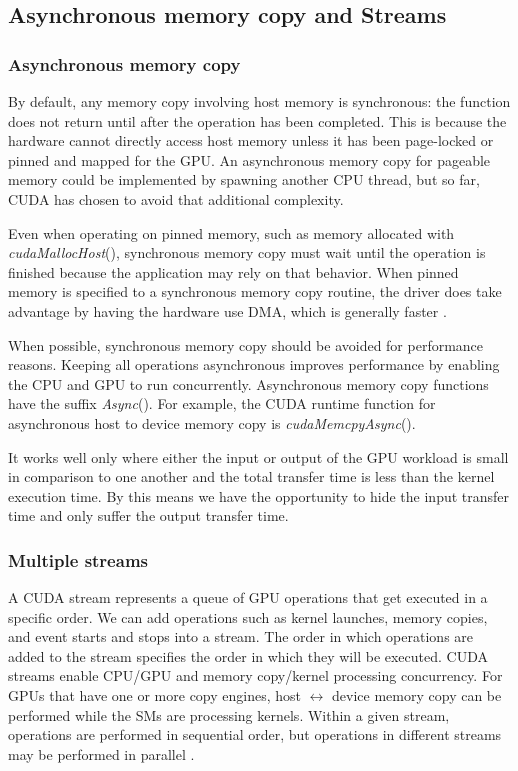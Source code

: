 \subsection{Asynchronous memory copy and Streams}
\label{asyn}

\subsubsection*{Asynchronous memory copy}
By default, any memory copy involving host memory is synchronous: the function does not return until after the operation has been completed. This is because the hardware cannot directly access host memory unless it has been page-locked or pinned and mapped for the GPU. An asynchronous memory copy for pageable memory could be implemented by spawning another CPU thread, but so far, CUDA has chosen to avoid that additional complexity.

Even when operating on pinned memory, such as memory allocated with \emph{cudaMallocHost}(), synchronous memory copy must wait until the operation is finished because the application may rely on that behavior. When pinned memory is specified to a synchronous memory copy routine, the driver does take advantage by having the hardware use DMA, which is generally faster \citep{CUDAHand}.

When possible, synchronous memory copy should be avoided for performance reasons. Keeping all operations asynchronous improves performance by enabling the CPU and GPU to run concurrently. Asynchronous memory copy functions have the suffix \emph{Async}(). For example, the CUDA runtime function for asynchronous host to device memory copy is \emph{cudaMemcpyAsync}().

It works well only where either the input or output of the GPU workload is small in comparison to one another and the total transfer time is less than the kernel execution time. By this means we have the opportunity to hide the input transfer time and only suffer the output transfer time.

\subsubsection*{Multiple streams}
A CUDA stream represents a queue of GPU operations that get executed in a specific order. We can add operations such as kernel launches, memory copies, and event starts and stops into a stream. The order in which operations are added to the stream specifies the order in which they will be executed. CUDA streams enable CPU/GPU and memory copy/kernel processing concurrency. For GPUs that have one or more copy engines, host $\longleftrightarrow$ device memory copy can be performed while the SMs are processing kernels. Within a given stream, operations are performed in sequential order, but operations in different streams may be performed in parallel \citep{CUDAintro}.

